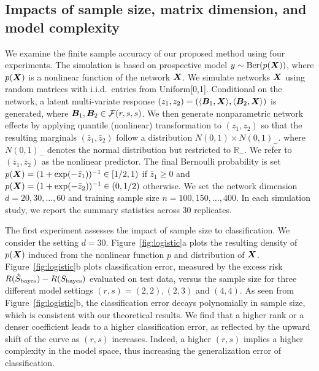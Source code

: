 \documentclass[11pt]{article}
\theoremstyle{definition}
\def\bayesS{S_{\textup{bayes}}}
\begin{document}
\subsection{Impacts of sample size, matrix dimension, and model complexity}\label{sec:validation}
We examine the finite sample accuracy of our proposed method using four experiments. The simulation is based on prospective model $y\sim \text{Ber}(p(\bm X))$, where $p(\bm X)$ is a nonlinear function of the network $\bm X$. We simulate networks $\bm X$ using random matrices with i.i.d.\ entries from Uniform[0,1]. Conditional on the network, a latent multi-variate response $(z_1,z_2)=\left(\langle \bm B_1, \bm X \rangle,\langle \bm B_2, \bm X \rangle\right)$ is generated, where $\bm B_1, \bm B_2\in \mathcal{F}(r,s,s)$.  We then generate nonparametric network effects by applying quantile (nonlinear) transformation to $(z_1, z_2)$ so that the resulting marginals $(\bar z_1, \bar z_2)$ follow a distribution $N(0,1)\times N(0,1)_-$. where $N(0,1)_-$ denotes the normal distribution but restricted to $\mathbb{R}_{-}$. We refer to $(\bar z_1,\bar z_2)$ as the nonlinear predictor. The final Bernoulli probability is set $p(\bm X)=(1+\exp(-\bar z_1))^{-1}\in[1/2,1)$ if $\bar z_1\geq 0$ and $p(\bm X)=(1+\exp(-\bar z_2))^{-1}\in(0,1/2)$ otherwise. We set the network dimension $d=20,30,\ldots,60$ and training sample size $n=100, 150, \ldots, 400$. In each simulation study, we report the summary statistics across $30$ replicates. 

The first experiment assesses the impact of sample size to classification. We consider the setting $d=30$. Figure~\ref{fig:logistic}a plots the resulting density of $p(\bm X)$ induced from the nonlinear function $p$ and distribution of $\bm X$. Figure~\ref{fig:logistic}b plots classification error, measured by the excess risk $R(\hat S_{\text{bayes}})-R(\bayesS)$ evaluated on test data, versus the sample size for three different model settings $(r,s)=(2,2), (2,3)$ and $(4,4)$. As seen from Figure~\ref{fig:logistic}b, the classification error decays polynomially in sample size, which is consistent with our theoretical results. We find that a higher rank or a denser coefficient leads to a higher classification error, as reflected by the upward shift of the curve as $(r,s)$ increases. Indeed, a higher $(r,s)$ implies a higher complexity in the model space, thus increasing the generalization error of classification. 
\end{document}
